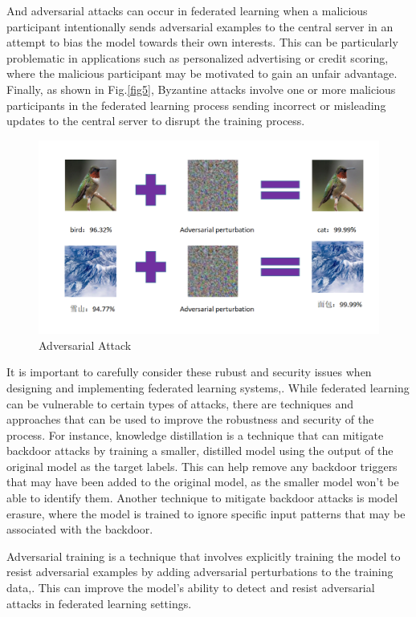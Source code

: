 \documentclass[conference]{IEEEtran}
\begin{document}
And adversarial attacks can occur in federated learning when a malicious participant intentionally sends adversarial examples to the central server in an attempt to bias the model
towards their own interests. This can be particularly problematic in applications such as personalized advertising or credit scoring, where the malicious participant may be motivated
to gain an unfair advantage. Finally, as shown in Fig.\ref{fig5}, Byzantine attacks involve one or more malicious participants in the federated learning process sending incorrect or misleading updates to the
central server to disrupt the training process\cite{b35}.
\begin{figure}[htbp]
    \centerline{\includegraphics[width=0.8\linewidth,height=0.6\linewidth]{picture/f2.png}}
    \caption{Adversarial Attack}
    \label{fig4}
\end{figure}

It is important to carefully consider these rubust and security issues when designing and implementing federated learning systems\cite{b38},\cite{b39}.
While federated learning can be vulnerable to certain types of attacks, there are techniques and approaches that can be used to improve the robustness and security of the process.
For instance, knowledge distillation is a technique that can mitigate backdoor attacks by training a smaller\cite{b36},
distilled model using the output of the original model as the target labels.
This can help remove any backdoor triggers that may have been added to the original model, as the smaller model won't be able to identify them.
Another technique to mitigate backdoor attacks is model erasure\cite{b44}, where the model is trained to ignore specific input patterns that may be associated with the backdoor.

Adversarial training is a technique that involves explicitly training the model to resist adversarial examples
by adding adversarial perturbations to the training data\cite{b31},\cite{b32}.
This can improve the model's ability to detect and resist adversarial attacks in federated learning settings.
\end{document}
